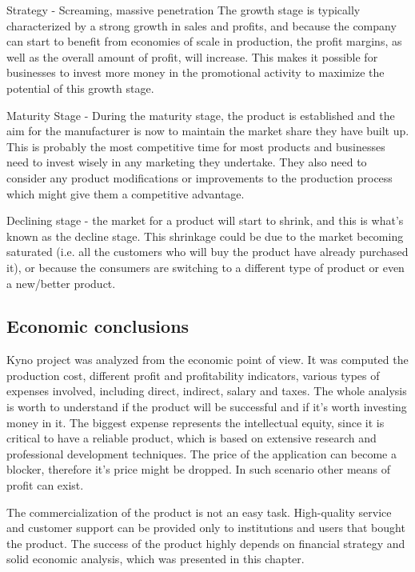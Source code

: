 Strategy - Screaming, massive penetration The growth stage is typically characterized by a strong growth in sales and profits, and because the company can start to benefit from economies of scale in production, the profit margins, as well as the overall amount of profit, will increase. This makes it possible for businesses to invest more money in the promotional activity to maximize the potential of this growth stage.

Maturity Stage - During the maturity stage, the product is established and the aim for the manufacturer is now to maintain the market share they have built up. This is probably the most competitive time for most products and businesses need to invest wisely in any marketing they undertake. They also need to consider any product modifications or improvements to the production process which might give them a competitive advantage.

Declining stage - the market for a product will start to shrink, and this is what's known as the decline stage. This shrinkage could be due to the market becoming saturated (i.e. all the customers who will buy the product have already purchased it), or because the consumers are switching to a different type of product or even a new/better product.


\subsection{Economic conclusions}
Kyno project was analyzed from the economic point of view. It was computed the production cost, different profit and profitability indicators, various types of expenses involved, including direct, indirect, salary and taxes. The whole analysis is worth to understand if the product will be successful and if it's worth investing money in it. The biggest expense represents the intellectual equity, since it is critical to have a reliable product, which is based on extensive research and professional development techniques. The price of the application can become a blocker, therefore it's price might be dropped. In such scenario other means of profit can exist.

The commercialization of the product is not an easy task. High-quality service and customer support can be provided only to institutions and users that bought the product. The success of the product highly depends on financial strategy and solid economic analysis, which was presented in this chapter.